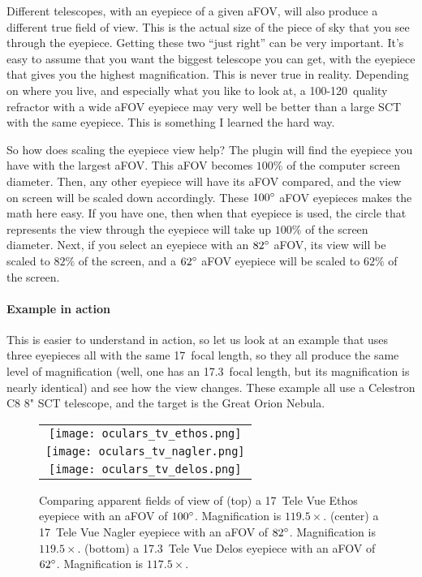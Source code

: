 Different telescopes, with an eyepiece of a given aFOV, will also produce a different true field of view. 
This is the actual size of the piece of sky that you see through the eyepiece. 
Getting these two ``just right'' can be very important. 
It's easy to assume that you want the biggest telescope you can get, with the eyepiece that gives you the highest magnification. 
This is never true in reality. Depending on where you live, and especially what you like to look at, a 100-120\mm\ quality refractor with a wide aFOV eyepiece may very well be better than a large SCT with the same eyepiece. This is something I learned the hard way.

So how does scaling the eyepiece view help? The plugin will find the eyepiece you have with the largest aFOV. This aFOV becomes $100\%$ of the computer screen diameter. 
Then, any other eyepiece will have its aFOV compared, and the view on screen will be scaled down accordingly. These $100\degree$ aFOV eyepieces makes the math here easy. If you have one, then when that eyepiece is used, the circle that represents the view through the eyepiece will take up $100\%$ of the screen diameter. Next, if you select an eyepiece with an $82\degree$ aFOV, its view will be scaled to $82\%$ of the screen, and a $62\degree$ aFOV eyepiece will be scaled to $62\%$ of the screen.

\paragraph{Example in action}

This is easier to understand in action, so let us look at an example that uses three eyepieces all with the same 17\mm\ focal length, 
so they all produce the same level of magnification (well, one has an 17.3\mm\ focal length, but its magnification is nearly identical) and see how the view changes.
These example all use a Celestron C8 8" SCT telescope, and the target is the Great Orion Nebula.

\begin{figure}[p]\centering
\begin{tabular}{c}
\texttt{[image: oculars\_tv\_ethos.png]}\\
\texttt{[image: oculars\_tv\_nagler.png]}\\
\texttt{[image: oculars\_tv\_delos.png]}
\end{tabular}
\caption{Comparing apparent fields of view of (top) a 17\mm\ Tele Vue Ethos eyepiece with an aFOV of $100\degree$. Magnification is $119.5\times$.
(center) a 17\mm\ Tele Vue Nagler eyepiece with an aFOV of $82\degree$. Magnification is $119.5\times$.
(bottom) a 17.3\mm\ Tele Vue Delos eyepiece with an aFOV of $62\degree$. Magnification is $117.5\times$.}
\label{fig:plugins:Oculars:TeleVue}
\end{figure}


